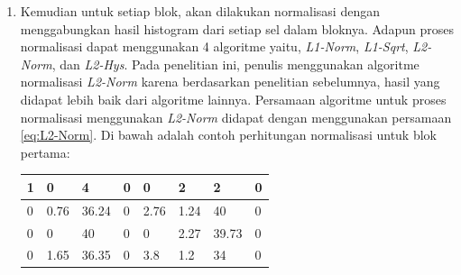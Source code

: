 \begin{enumerate}
\begin{adjustbox}{width=1\textwidth}
\begin{minipage}{\linewidth}
		\label{fig:HasilHOG}
	\end{minipage}
\end{adjustbox}
\item Kemudian untuk setiap blok, akan dilakukan normalisasi dengan menggabungkan hasil histogram dari setiap sel dalam bloknya. Adapun proses normalisasi dapat menggunakan 4 algoritme yaitu, \textit{L1-Norm}, \textit{L1-Sqrt}, \textit{L2-Norm}, dan \textit{L2-Hys}. Pada penelitian ini, penulis menggunakan algoritme normalisasi \textit{L2-Norm} karena berdasarkan penelitian sebelumnya, hasil yang didapat lebih baik dari algoritme lainnya. Persamaan algoritme untuk proses normalisasi menggunakan \textit{L2-Norm} didapat dengan menggunakan persamaan \ref{eq:L2-Norm}. Di bawah adalah contoh perhitungan normalisasi untuk blok pertama:
\begin{table}[H]
	\centering
	\begin{small}
		\begin{tabular}{|p{1cm}|p{1cm}|p{1cm}|p{1cm}|p{1cm}|p{1cm}|p{1cm}|p{1cm}|}
			\hline
			1 & 0 & 4 & 0 & 0 & 2 & 2 & 0 \\
			\hline
			0 & 0.76 & 36.24 & 0 & 2.76 & 1.24 & 40 & 0 \\
			\hline
			0 & 0 & 40 & 0 & 0 & 2.27 & 39.73 & 0 \\
			\hline
			0 & 1.65 & 36.35 & 0 & 3.8 & 1.2 & 34 & 0 \\
			\hline
		\end{tabular}
	\end{small}
	\label{fig:MatriksHasilPerhitunganHistogram}

\end{table}
\end{enumerate}
